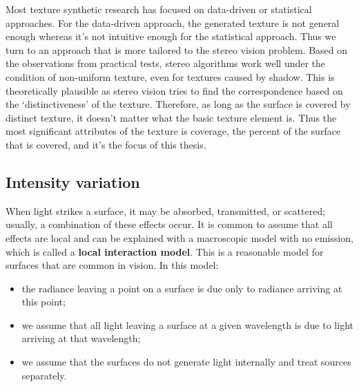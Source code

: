 Most texture synthetic research has focused on data-driven or statistical approaches. For the data-driven approach, the generated texture is not general enough whereas it's not intuitive enough for the statistical approach. Thus we turn to an approach that is more tailored to the stereo vision problem. Based on the observations from practical tests, stereo algorithms work well under the condition of non-uniform texture, even for textures caused by shadow. This is theoretically plausible as stereo vision tries to find the correspondence based on the `distinctiveness' of the texture. Therefore, as long as the surface is covered by distinct texture, it doesn't matter what the basic texture element is. Thus the most significant attributes of the texture is coverage, \ie the percent of the surface that is covered, and it's the focus of this thesis.



\subsection{Intensity variation}
When light strikes a surface, it may be absorbed, transmitted, or scattered; usually, a combination of these effects occur. It is common to assume that all effects are local and can be explained with a macroscopic model with no emission, which is called a \textbf{local interaction model}. This is a reasonable model for surfaces that are common in vision. In this model:
\begin{itemize}
\item the radiance leaving a point on a surface is due only to radiance arriving at this point;
\item we assume that all light leaving a surface at a given wavelength is due to light arriving at that wavelength;
\item we assume that the surfaces do not generate light internally and treat sources separately.
\end{itemize}

